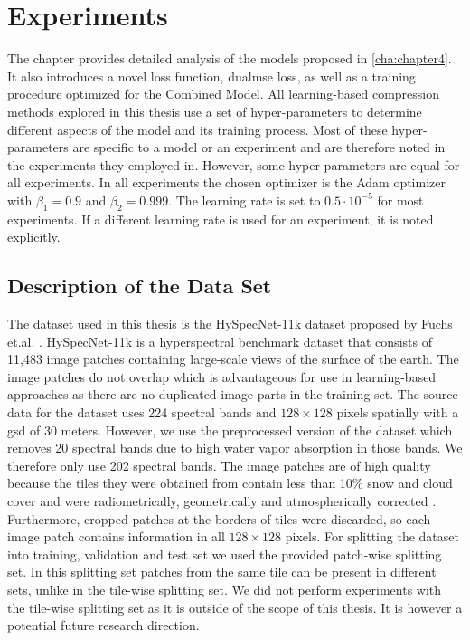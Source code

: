 \chapter{Experiments\label{cha:chapter5}}
The chapter provides detailed analysis of the models proposed in \autoref{cha:chapter4}. It also introduces a novel loss function, \ac{dualmse} loss, as well as a training procedure optimized for the Combined Model. All learning-based compression methods explored in this thesis use a set of hyper-parameters to determine different aspects of the model and its training process. Most of these hyper-parameters are specific to a model or an experiment and are therefore noted in the experiments they employed in. However, some hyper-parameters are equal for all experiments. In all experiments the chosen optimizer is the Adam optimizer with $\beta_1=0.9$ and $\beta_2=0.999$. The learning rate is set to $0.5 \cdot 10^{-5}$ for most experiments. If a different learning rate is used for an experiment, it is noted explicitly.

\section{Description of the Data Set\label{sec:dataset}}
The dataset used in this thesis is the HySpecNet-11k dataset proposed by Fuchs et.al. \citep{fuchs_hyspecnet-11k_2023}. HySpecNet-11k is a hyperspectral benchmark dataset that consists of 11,483 image patches containing large-scale views of the surface of the earth. The image patches do not overlap which is advantageous for use in learning-based approaches as there are no duplicated image parts in the training set. The source data for the dataset uses 224 spectral bands and $128\times 128$ pixels spatially with a \ac{gsd} of 30 meters. However, we use the preprocessed version of the dataset which removes 20 spectral bands due to high water vapor absorption in those bands. We therefore only use 202 spectral bands. The image patches are of high quality because the tiles they were obtained from contain less than 10\% snow and cloud cover and were radiometrically, geometrically and atmospherically corrected \citep{fuchs_hyspecnet-11k_2023}. Furthermore, cropped patches at the borders of tiles were discarded, so each image patch contains information in all $128\times 128$ pixels. For splitting the dataset into training, validation and test set we used the provided patch-wise splitting set. In this splitting set patches from the same tile can be present in different sets, unlike in the tile-wise splitting set. We did not perform experiments with the tile-wise splitting set as it is outside of the scope of this thesis. It is however a potential future research direction.

